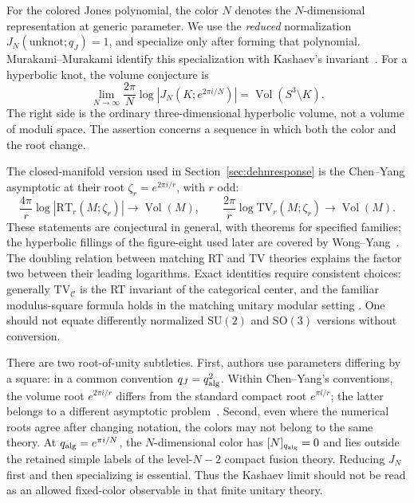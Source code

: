 \documentclass[11pt,a4paper]{article}
\numberwithin{equation}{section}
\theoremstyle{definition}
\theoremstyle{remark}
\DeclareMathOperator{\Vol}{Vol}
\begin{document}
For the colored Jones polynomial, the color $N$ denotes the
$N$-dimensional representation at generic parameter. We use the
\emph{reduced} normalization $J_N(\text{unknot};q_J)=1$, and specialize
only after forming that polynomial. Murakami--Murakami identify this
specialization with Kashaev's invariant~\cite{MurakamiMurakami}.
For a hyperbolic knot, the volume conjecture is
\begin{equation}
 \lim_{N\to\infty}\frac{2\pi}{N}
 \log|J_N(K;e^{2\pi i/N})|=\Vol(S^3\setminus K).
 \label{eq:introknotvolume}
\end{equation}
The right side is the ordinary three-dimensional hyperbolic volume,
not a volume of moduli space. The assertion concerns a sequence in
which both the color and the root change.

The closed-manifold version used in Section~\ref{sec:dehnresponse}
is the Chen--Yang asymptotic at their root $\zeta_r=e^{2\pi i/r}$,
with $r$ odd:
\begin{equation}
 \frac{4\pi}{r}\log|\mathrm{RT}_r(M;\zeta_r)|\longrightarrow\Vol(M),
 \qquad
 \frac{2\pi}{r}\log\mathrm{TV}_r(M;\zeta_r)\longrightarrow\Vol(M).
 \label{eq:introclosedvolume}
\end{equation}
These statements are conjectural in general, with theorems for
specified families; the hyperbolic fillings of the figure-eight used
later are covered by Wong--Yang~\cite{WongYangDehn}. The doubling
relation between matching RT and TV theories explains the factor
two between their leading logarithms. Exact identities require
consistent choices: generally $\mathrm{TV}_{\mathcal C}$ is the RT
invariant of the categorical center, and the familiar modulus-square
formula holds in the matching unitary modular setting
\cite{TuraevVirelizier}. One should not equate differently normalized
$\mathrm{SU}(2)$ and $\mathrm{SO}(3)$ versions without conversion.

There are two root-of-unity subtleties. First, authors use parameters
differing by a square: in a common convention $q_J=q_{\rm alg}^2$.
Within Chen--Yang's conventions, the volume root $e^{2\pi i/r}$
differs from the standard compact root $e^{\pi i/r}$; the latter
belongs to a different asymptotic problem~\cite{ChenYang}.
Second, even where the numerical roots agree after changing notation,
the colors may not belong to the same theory. At
$q_{\rm alg}=e^{\pi i/N}$, the $N$-dimensional color has
$[N]_{q_{\rm alg}}=0$ and lies outside the retained simple labels
of the level-$N-2$ compact fusion theory. Reducing $J_N$ first and
then specializing is essential. Thus the Kashaev limit should not
be read as an allowed fixed-color observable in that finite unitary
theory.
\end{document}
